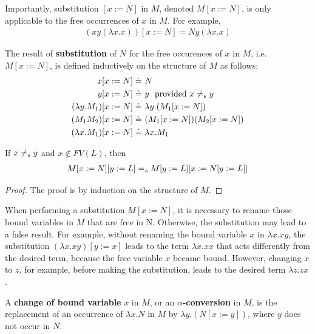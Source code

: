 Importantly, substitution $[x:=N]$ in $M$, denoted $M[x:=N]$, is only applicable to the free occurrences of $x$ in $M$. For example,
\begin{align*}
(xy(\lambda x.x))[x:=N] = Ny(\lambda x.x)
\end{align*}

\begin{definition}[Substitution] The result of \textbf{substitution} of $N$ for the free occurences of $x$ in $M$, i.e. $M[x:=N]$, is defined inductively on the structure of $M$ as follows:
\begin{align*}
 x[x:=N] \doteq  \ & N \\
 y[x:=N] \doteq  \ &  y \ \ \text{provided} \ x \neq_s y \\
 (\lambda y.M_1)[x:=N] \doteq   \ & \lambda y. (M_1 [x:=N]) \\
 (M_1 M_2)[x:=N] \doteq  \  & (M_1[x:=N])(M_2[x:=N]) \\
 (\lambda x.M_1)[x:=N]  \doteq \ & \lambda x.M_1
\end{align*}

\end{definition}

\begin{lemma} If  $x \neq_s y$ and $x \notin FV(L)$, then
\begin{align*}
 M[x:=N][y:=L] =_s M[y:=L][x:=N[y:=L]]
\end{align*}
\end{lemma}
\begin{proof} The proof is by induction on the structure of $M$.
\end{proof}


When performing a substitution $M[x:=N]$, it is necessary to rename those bound variables in $M$ that are free in N. Otherwise, the substitution 
may lead to a false result. For example, without renaming the bound variable $x$ in $\lambda x.xy$, the substitution  $(\lambda x.xy)[y:=x]$ leads to the term $\lambda x.xx$ that acts differently from the desired term, because the free variable $x$ became bound. However, changing $x$ to $z$, for example, before making the substitution, leads to the desired term $\lambda z.zx$. 

\begin{definition} A \textbf{change of bound variable} $x$ in $M$, or an \textbf{$\alpha$-conversion} in $M$, is the replacement of an occurrence of $\lambda x.N$ in $M$ by $\lambda y.(N[x:=y])$, where $y$ does not occur in $N$.
\end{definition}

